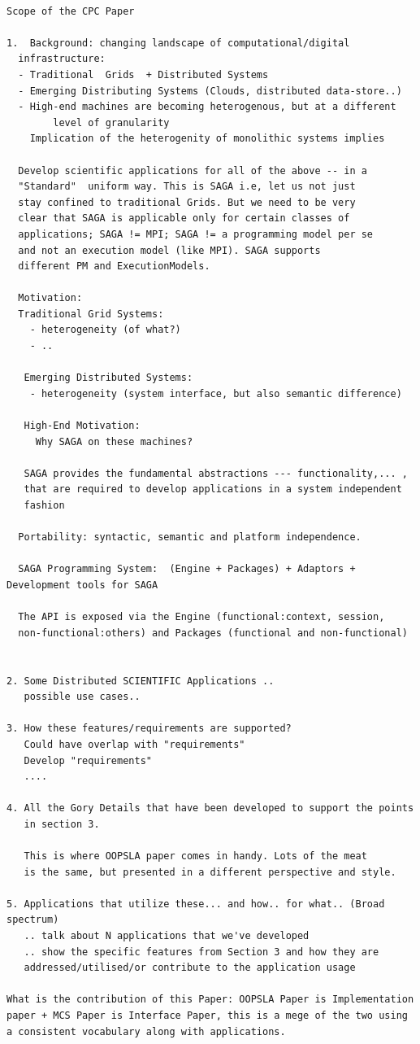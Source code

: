 \documentclass[10pt,letterpaper]{article}
\begin{document}
\begin{verbatim}

Scope of the CPC Paper

1.  Background: changing landscape of computational/digital
  infrastructure:
  - Traditional  Grids	+ Distributed Systems
  - Emerging Distributing Systems (Clouds, distributed data-store..)
  - High-end machines are becoming heterogenous, but at a different
        level of granularity
    Implication of the heterogenity of monolithic systems implies

  Develop scientific applications for all of the above -- in a
  "Standard"  uniform way. This is SAGA i.e, let us not just
  stay confined to traditional Grids. But we need to be very 
  clear that SAGA is applicable only for certain classes of 
  applications; SAGA != MPI; SAGA != a programming model per se
  and not an execution model (like MPI). SAGA supports
  different PM and ExecutionModels.

  Motivation: 
  Traditional Grid Systems:
    - heterogeneity (of what?)
    - .. 
  
   Emerging Distributed Systems:
    - heterogeneity (system interface, but also semantic difference)

   High-End Motivation:
     Why SAGA on these machines?

   SAGA provides the fundamental abstractions --- functionality,... ,
   that are required to develop applications in a system independent
   fashion
 
  Portability: syntactic, semantic and platform independence.

  SAGA Programming System:  (Engine + Packages) + Adaptors + Development tools for SAGA

  The API is exposed via the Engine (functional:context, session,
  non-functional:others) and Packages (functional and non-functional)


2. Some Distributed SCIENTIFIC Applications .. 
   possible use cases..

3. How these features/requirements are supported?
   Could have overlap with "requirements" 
   Develop "requirements"
   ....

4. All the Gory Details that have been developed to support the points
   in section 3.

   This is where OOPSLA paper comes in handy. Lots of the meat 
   is the same, but presented in a different perspective and style.

5. Applications that utilize these... and how.. for what.. (Broad spectrum)
   .. talk about N applications that we've developed
   .. show the specific features from Section 3 and how they are
   addressed/utilised/or contribute to the application usage
  
What is the contribution of this Paper: OOPSLA Paper is Implementation
paper + MCS Paper is Interface Paper, this is a mege of the two using
a consistent vocabulary along with applications.

\end{verbatim}
\newpage
\end{document}
